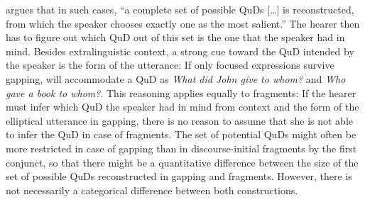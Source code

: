 \citet[477]{reich2007} argues that in such cases, ``a complete set of possible QuDs [\dots] is reconstructed, from which the speaker chooses exactly one as the most salient.'' The hearer then has to figure out which QuD out of this set is the one that the speaker had in mind. Besides extralinguistic context, a strong cue toward the QuD intended by the speaker is the form of the utterance: If only focused expressions survive gapping, \Last[a] will accommodate a QuD as \textit{What did John give to whom?}  and \Last[b] \textit{Who gave a book to whom?}. This reasoning applies equally to fragments: If the hearer must infer which QuD the speaker had in mind from context and the form of the elliptical utterance in gapping, there is no reason to assume that she is not able to infer the QuD in case of fragments. The set of potential QuDs might often be more restricted in case of gapping than in discourse-initial fragments by the first conjunct, so that there might be a quantitative difference between the size of the set of possible QuDs reconstructed in gapping and fragments. However, there is not necessarily a categorical difference between both constructions.

